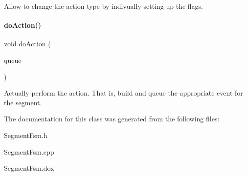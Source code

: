 Allow to change the action type by indivually setting up the flags. \mbox{\label{classKite_1_1SegmentAction_a324f17f0f5a09b76344eb2e003695d74}} 
\paragraph{\texorpdfstring{do\+Action()}{doAction()}}
{\footnotesize\ttfamily void do\+Action (\begin{DoxyParamCaption}\item[{\mbox{\hyperlink{classKite_1_1RoutingEventQueue}{Routing\+Event\+Queue}} \&}]{queue }\end{DoxyParamCaption})}

Actually perform the action. That is, build and queue the appropriate event for the segment. 

The documentation for this class was generated from the following files\+:\begin{DoxyCompactItemize}
\item 
Segment\+Fsm.\+h\item 
Segment\+Fsm.\+cpp\item 
Segment\+Fsm.\+dox\end{DoxyCompactItemize}
